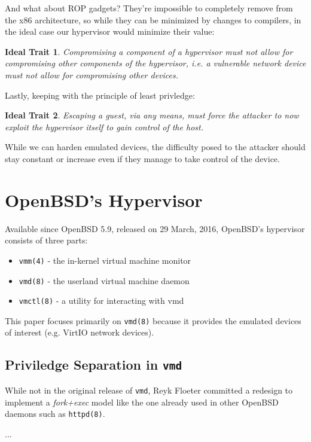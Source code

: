 \documentclass[conference]{IEEEtran}
\newtheorem{trait}{Ideal Trait}
\begin{document}
And what about ROP gadgets? They're impossible to completely remove
from the x86 architecture, so while they can be minimized by changes
to compilers, in the ideal case our hypervisor would minimize their
value:

\begin{trait}
Compromising a component of a hypervisor must not allow for
compromising other components of the hypervisor, i.e. a vulnerable
network device must not allow for compromising other devices.
\end{trait}

Lastly, keeping with the principle of least privledge:

\begin{trait}
Escaping a guest, via any means, must force the attacker to now
exploit the hypervisor itself to gain control of the host.
\end{trait}

While we can harden emulated devices, the difficulty posed to the
attacker should stay constant or increase even if they manage to take
control of the device.


\section{OpenBSD's Hypervisor}
Available since OpenBSD 5.9, released on 29 March, 2016, OpenBSD's
hypervisor consists of three parts:

\begin{itemize}
\item \texttt{vmm(4)} - the in-kernel virtual machine monitor
\item \texttt{vmd(8)} - the userland virtual machine daemon
\item \texttt{vmctl(8)} - a utility for interacting with vmd
\end{itemize}

This paper focuses primarily on \texttt{vmd(8)} because it provides
the emulated devices of interest (e.g. VirtIO network devices).

\subsection{Priviledge Separation in \texttt{vmd}}
While not in the original release of \texttt{vmd}, Reyk Floeter
committed \cite{b6} a redesign to implement a \emph{fork+exec} model
like the one already used in other OpenBSD daemons such as
\texttt{httpd(8)}.

...
\end{document}
